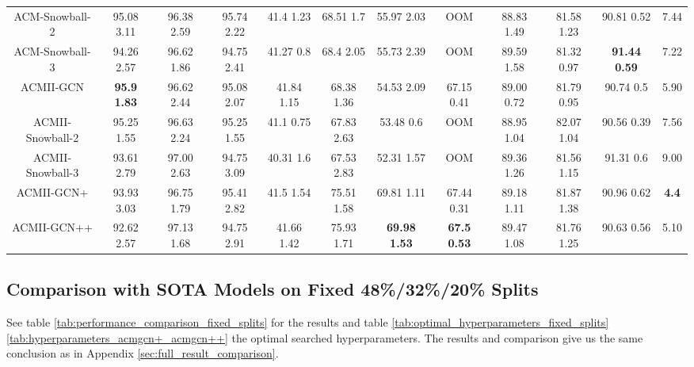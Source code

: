 \documentclass{article}
\newcommand{\0}{{\boldsymbol{0}}}
\newcommand{\6}{{\partial}}
\newcommand{\8}{{\infty}}
\newcommand{\4}{{\nabla}}
\begin{document}
\begin{table}[htbp]
\begin{tabular}{c|cccccccccc|c}
    ACM-Snowball-2 & 95.08  3.11 & 96.38  2.59 & 95.74  2.22 & 41.4  1.23 & 68.51  1.7 & 55.97  2.03 & OOM   & 88.83  1.49 & 81.58  1.23 & 90.81  0.52 & 7.44 \\
    ACM-Snowball-3 & 94.26  2.57 & 96.62  1.86 & 94.75  2.41 & 41.27  0.8 & 68.4  2.05 & 55.73  2.39 & OOM   & 89.59  1.58 & 81.32  0.97 & \cellcolor[rgb]{ .816,  .808,  .808}\textbf{91.44  0.59} & 7.22 \\
    \midrule
    ACMII-GCN & \cellcolor[rgb]{ .816,  .808,  .808}\textbf{95.9  1.83} & 96.62  2.44 & 95.08  2.07 & 41.84  1.15 & 68.38  1.36 & 54.53  2.09 & 67.15  0.41 & 89.00  0.72 & 81.79  0.95 & 90.74  0.5 & 5.90 \\
    ACMII-Snowball-2 & 95.25  1.55 & 96.63  2.24 & 95.25  1.55 & 41.1  0.75 & 67.83  2.63 & 53.48  0.6 & OOM   & 88.95  1.04 & 82.07  1.04 & 90.56  0.39 & 7.56 \\
    ACMII-Snowball-3 & 93.61  2.79 & 97.00  2.63 & 94.75  3.09 & 40.31  1.6 & 67.53  2.83 & 52.31  1.57 & OOM   & 89.36  1.26 & 81.56  1.15 & 91.31  0.6 & 9.00 \\
    ACMII-GCN+ & 93.93  3.03 & 96.75  1.79 & 95.41  2.82 & 41.5  1.54 & 75.51  1.58 & 69.81  1.11 & 67.44  0.31 & 89.18  1.11 & 81.87  1.38 & 90.96  0.62 & \cellcolor[rgb]{ .816,  .808,  .808}\textbf{4.4} \\
    ACMII-GCN++ & 92.62  2.57 & 97.13  1.68 & 94.75  2.91 & 41.66  1.42 & 75.93  1.71 & \cellcolor[rgb]{ .816,  .808,  .808}\textbf{69.98  1.53} & \cellcolor[rgb]{ .816,  .808,  .808}\textbf{67.5  0.53} & 89.47  1.08	 & 81.76  1.25 & 90.63  0.56 & 5.10 \\
    \bottomrule
    \bottomrule
    \end{tabular}\label{tab:sota}\end{table} \subsection{Comparison with SOTA Models on Fixed 48\%/32\%/20\% Splits}
See table \ref{tab:performance_comparison_fixed_splits} for the results \label{appendix:results_on_fixed_splits_as_geomgcn}
and table \ref{tab:optimal_hyperparameters_fixed_splits} \ref{tab:hyperparameters_acmgcn+_acmgcn++} the optimal searched hyperparameters. The results and comparison give us the same conclusion as in Appendix \ref{sec:full_result_comparison}.
\end{document}
